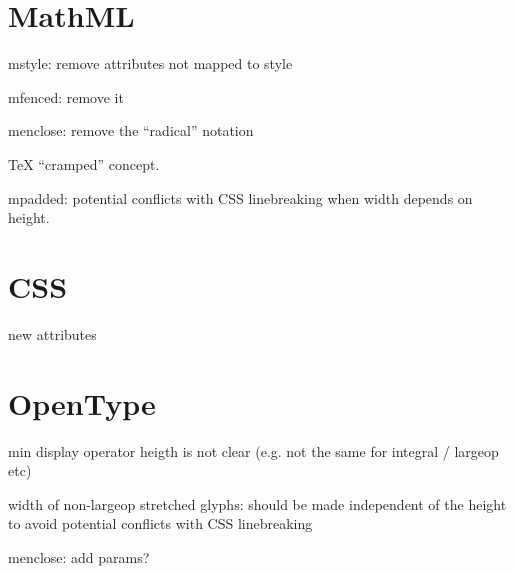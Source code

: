 \appendix

\section{MathML}

mstyle: remove attributes not mapped to style

mfenced: remove it

menclose: remove the ``radical'' notation

TeX ``cramped'' concept.

mpadded: potential conflicts with CSS linebreaking when width depends on height.

\section{CSS}

new attributes

\section{OpenType}

min display operator heigth is not clear
(e.g. not the same for integral / largeop etc)

width of non-largeop stretched glyphs: should be made independent of the
height to avoid potential conflicts with CSS linebreaking

menclose: add params?
